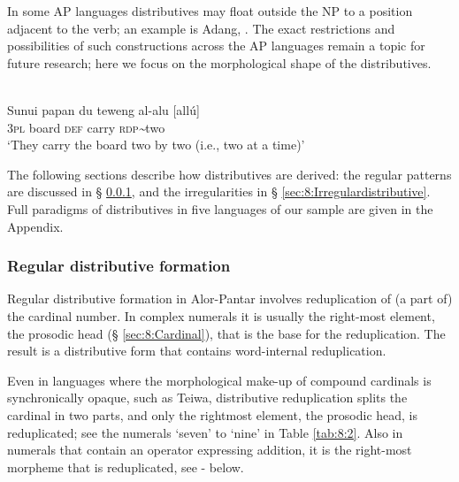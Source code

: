    

  

   

In some AP languages distributives may float outside the NP to a position adjacent to the verb; an example is Adang, . The exact restrictions and possibilities of such constructions across the AP languages remain a topic for future research; here we focus on the morphological shape of the distributives.


\ea
\label{ex:8:1235}
\\
 \gll  Sunui{\textltailn}   papan   du   teweng al-alu  [all\'u]\\
   3\textsc{pl}    board  \textsc{def}   carry   \textsc{rdp}\textit{\~{}}two \\
 \glt `They carry the board two by two (i.e., two at a time)'
\z

    

 

 

The following sections describe how distributives are derived: the regular patterns are discussed in {\S} \ref{sec:8:Regulardistributive}, and the irregularities in {\S} \ref{sec:8:Irregulardistributive}.  Full paradigms of distributives in five languages of our sample are given in the Appendix.

\subsubsection{Regular distributive formation  }
\label{sec:8:Regulardistributive}
Regular distributive formation in Alor-Pantar involves reduplication of (a part of) the cardinal number. In complex numerals it is usually the right-most element, the prosodic head ({\S} \ref{sec:8:Cardinal}), that is the base for the reduplication. The result is a distributive form that contains word-internal reduplication. 

Even in languages where the morphological make-up of compound cardinals is synchronically opaque, such as Teiwa, distributive reduplication splits the cardinal in two parts, and only the rightmost element, the prosodic head, is reduplicated; see the numerals `seven' to `nine' in Table \ref{tab:8:2}. Also in numerals that contain an operator expressing addition, it is the right-most morpheme that is reduplicated, see - below.
 


